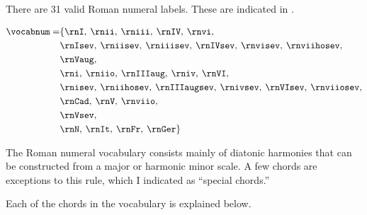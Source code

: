 
There are 31 valid Roman numeral labels. These are indicated
in .


\begin{equation}
    \begin{split}
    \vocabnum = & \{ \rnI, \: \rnii, \: \rniii, \: \rnIV, \: \rnvi,\\
                & \rnIsev, \: \rniisev, \: \rniiisev, \: \rnIVsev, \: \rnvisev, \: \rnviihosev,\\
                & \rnVaug,\\
                & \rni, \: \rniio, \: \rnIIIaug, \: \rniv, \: \rnVI,\\ 
                & \rnisev, \: \rniihosev, \: \rnIIIaugsev, \: \rnivsev, \: \rnVIsev, \: \rnviiosev,\\
                & \rnCad, \: \rnV, \: \rnviio,\\
                & \rnVsev,\\
                & \rnN, \: \rnIt, \: \rnFr, \: \rnGer \}
    \end{split}
\end{equation}

The Roman numeral vocabulary consists mainly of diatonic
harmonies that can be constructed from a major or harmonic
minor scale. A few chords are exceptions to this rule, \: which
I indicated as ``special chords.''

Each of the chords in the vocabulary is explained below.


